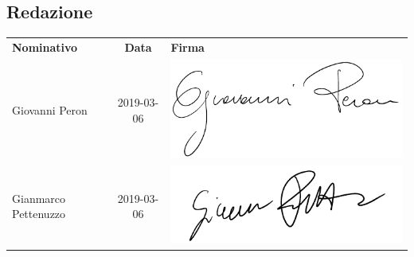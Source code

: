 \subsection{Redazione}

{\renewcommand{\arraystretch}{1.4}%
\begin{table}[H]
	\centering
	\begin{tabular}{| l | c | >{\centering\arraybackslash}m{8cm}
			|} 
		\rowcolor{LightBlue}
		\textbf{\color{white}Nominativo} & 
		\textbf{\color{white}Data} & 
		\textbf{\color{white}Firma} \\
	
	Giovanni Peron & 2019-03-06 & \includegraphics[scale=0.5]{images/firme/perry.pdf}\\
	Gianmarco Pettenuzzo & 2019-03-06 & \includegraphics[scale=0.5]{images/firme/giammi.pdf}\\

\end{tabular}
\end{table}}
